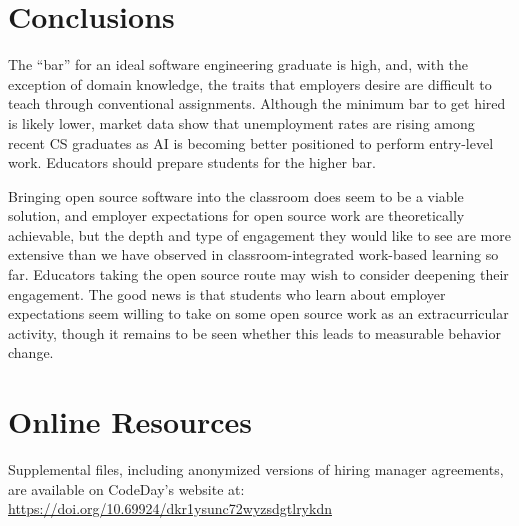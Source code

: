 \section{Conclusions}

The ``bar'' for an ideal software engineering graduate is high, and, with the exception of domain knowledge, the traits that employers desire are difficult to teach through conventional assignments. Although the minimum bar to get hired is likely lower, market data show that unemployment rates are rising among recent CS graduates as AI is becoming better positioned to perform entry-level work. Educators should prepare students for the higher bar.

Bringing open source software into the classroom does seem to be a viable solution, and employer expectations for open source work are theoretically achievable, but the depth and type of engagement they would like to see are more extensive than we have observed in classroom-integrated work-based learning so far. Educators taking the open source route may wish to consider deepening their engagement. The good news is that students who learn about employer expectations seem willing to take on some open source work as an extracurricular activity, though it remains to be seen whether this leads to measurable behavior change.

\section*{Online Resources}

Supplemental files, including anonymized versions of hiring manager agreements, are available on CodeDay's website at:\\ \url{https://doi.org/10.69924/dkr1ysunc72wyzsdgtlrykdn} \cite{sahaSupplementalFilesOpen2025}